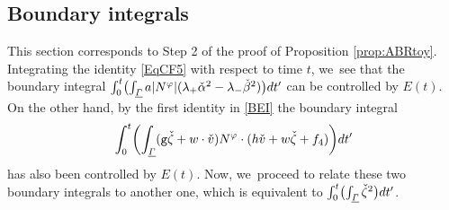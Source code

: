 \documentclass[11pt]{article}
\newcommand{\gr}{{\mathtt g}}
\newcommand{\ul}[1]{\underline{#1}}
\newcommand{\itGamma}{\mathit{\Gamma}}
\theoremstyle{definition}
\begin{document}
\subsection{Boundary integrals}
This section corresponds to Step 2 of the proof of Proposition \ref{prop:ABRtoy}.
Integrating the identity \eqref{EqCF5} with respect to time $t$, we~see that the boundary integral
$\int_0^t \bigl(\int_{\ul{\itGamma}} a|N^\varphi|(\lambda_+\check{\alpha}^2-\lambda_-\check{\beta}^2) \bigr){\rm d}t'$ can be controlled by $E(t)$.
On the other hand, by the first identity in \eqref{BEI} the boundary integral
\[
\int_0^t\biggl(\int_{\ul{\itGamma}}(\gr\check{\zeta}+w\cdot\check{v})N^\varphi\cdot(h\check{v}+w\check{\zeta}+f_4) \biggr){\rm d}t'
\]
has also been controlled by $E(t)$.
Now, we~proceed to relate these two boundary integrals to another one, which is equivalent to
$\int_0^t \bigl(\int_{\ul{\itGamma}}\check{\zeta}^2 \bigr){\rm d}t'$.
\end{document}
